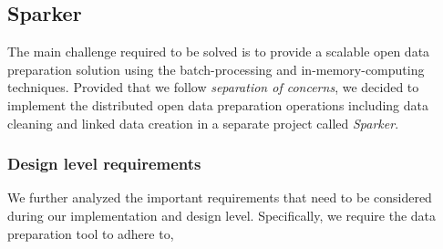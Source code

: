 \subsection{Sparker}
\label{sec:sparker}
The main challenge required to be solved is to provide a scalable open data preparation solution using the batch-processing and in-memory-computing techniques. Provided that we follow \textit{separation of concerns}, we decided to implement the distributed open data preparation operations including data cleaning and linked data creation in a separate project called \textit{Sparker}. 
\subsubsection{Design level requirements}
\label{designreq}
We further analyzed the important requirements that need to be considered during our implementation and design level. Specifically, we require the data preparation tool to adhere to,
